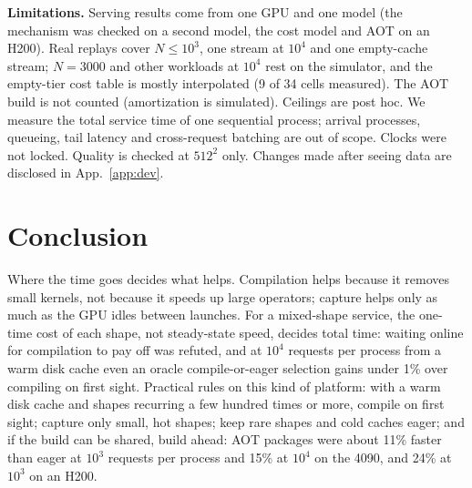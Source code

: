 \documentclass[conference]{IEEEtran}
\newcommand{\tn}[1]{#1}%
\begin{document}
\textbf{Limitations.} Serving results come from one GPU and one model (the mechanism was checked on a second model, the cost model and AOT on an H200). Real replays cover $N{\le}10^3$, one stream at $10^4$ and one empty-cache stream; $N{=}3000$ and other workloads at $10^4$ rest on the simulator, and the empty-tier cost table is mostly interpolated (\tn{9 of 34} cells measured). The AOT build is not counted (amortization is simulated). Ceilings are post hoc. We measure the total service time of one sequential process; arrival processes, queueing, tail latency and cross-request batching are out of scope. Clocks were not locked. Quality is checked at $512^2$ only. Changes made after seeing data are disclosed in App.~\ref{app:dev}.

\section{Conclusion}\label{m:concl}
Where the time goes decides what helps. Compilation helps because it removes small kernels, not because it speeds up large operators; capture helps only as much as the GPU idles between launches. For a mixed-shape service, the one-time cost of each shape, not steady-state speed, decides total time: waiting online for compilation to pay off was refuted, and at $10^4$ requests per process from a warm disk cache even an oracle compile-or-eager selection gains under 1\% over compiling on first sight. Practical rules on this kind of platform: with a warm disk cache and shapes recurring a few hundred times or more, compile on first sight; capture only small, hot shapes; keep rare shapes and cold caches eager; and if the build can be shared, build ahead: AOT packages were about 11\% faster than eager at $10^3$ requests per process and 15\% at $10^4$ on the 4090, and 24\% at $10^3$ on an H200.




\onecolumn
\appendices
\footnotesize
\end{document}
